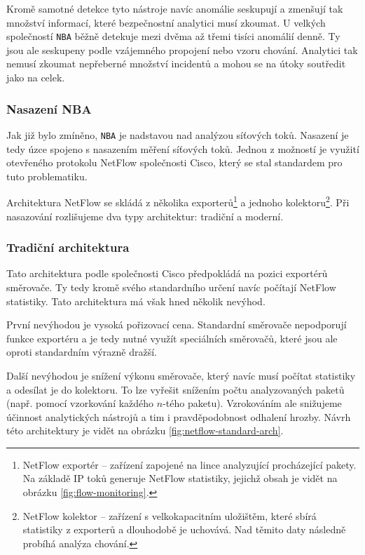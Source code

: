 Kromě samotné detekce tyto nástroje navíc anomálie seskupují a zmenšují tak množství informací, které bezpečnostní analytici musí zkoumat.
U velkých společností \texttt{NBA} běžně detekuje mezi dvěma až třemi tisíci anomálií denně.
Ty jsou ale seskupeny podle vzájemného propojení nebo vzoru chování.
Analytici tak nemusí zkoumat nepřeberné množství incidentů a mohou se na útoky soutředit jako na celek.

\subsubsection*{Nasazení NBA}

Jak již bylo zmíněno, \texttt{NBA} je nadstavou nad analýzou síťových toků.
Nasazení je tedy úzce spojeno s nasazením měření síťových toků.
Jednou z možností je využití otevřeného protokolu NetFlow společnosti Cisco, který se stal standardem pro tuto problematiku.

Architektura NetFlow se skládá z několika exporterů\footnote{NetFlow exportér -- zařízení zapojené na lince analyzující procházející pakety. Na základě IP toků generuje NetFlow statistiky, jejichž obsah je vidět na obrázku \ref{fig:flow-monitoring}.} a jednoho kolektoru\footnote{NetFlow kolektor -- zařízení s velkokapacitním uložištěm, které sbírá statistiky z exporterů a dlouhodobě je uchovává. Nad těmito daty následně probíhá analýza chování.}.
Při nasazování rozlišujeme dva typy architektur: tradiční a moderní.

\subsubsection*{Tradiční architektura}

Tato architektura podle společnosti Cisco předpokládá na pozici exportérů směrovače.
Ty tedy kromě svého standardního určení navíc počítají NetFlow statistiky.
Tato architektura má však hned několik nevýhod.

První nevýhodou je vysoká pořizovací cena.
Standardní směrovače nepodporují funkce exportéru a je tedy nutné využít speciálních směrovačů, které jsou ale oproti standardním výrazně dražší.

Další nevýhodou je snížení výkonu směrovače, který navíc musí počítat statistiky a odesílat je do kolektoru.
To lze vyřešit snížením počtu analyzovaných paketů (např. pomocí vzorkování každého $n$-tého paketu).
Vzrokováním ale snižujeme účinnost analytických nástrojů a tim i pravděpodobnost odhalení hrozby.
Návrh této architektury je vidět na obrázku \ref{fig:netflow-standard-arch}.

